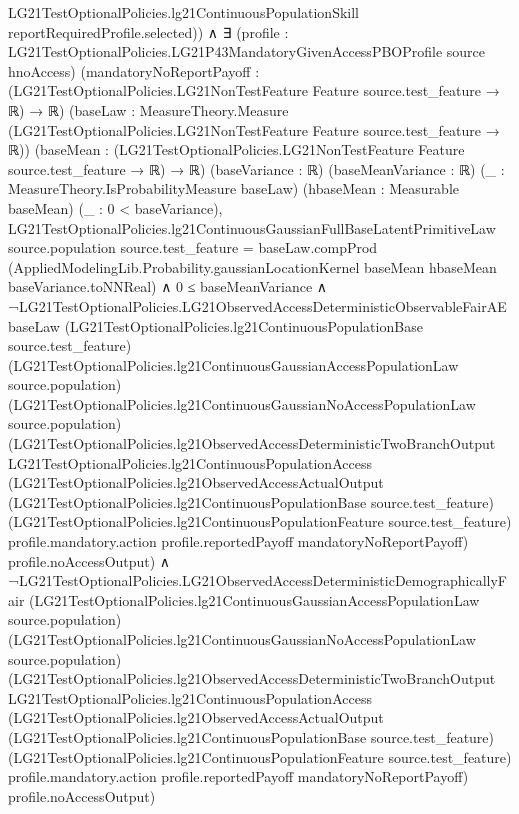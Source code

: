 \documentclass[10pt]{article}
\begin{document}
\begin{ReviewVerbatim}
          LG21TestOptionalPolicies.lg21ContinuousPopulationSkill reportRequiredProfile.selected)) ∧
    ∃ (profile : LG21TestOptionalPolicies.LG21P43MandatoryGivenAccessPBOProfile source hnoAccess)
      (mandatoryNoReportPayoff : (LG21TestOptionalPolicies.LG21NonTestFeature Feature source.test_feature → ℝ) → ℝ)
      (baseLaw : MeasureTheory.Measure (LG21TestOptionalPolicies.LG21NonTestFeature Feature source.test_feature → ℝ))
      (baseMean : (LG21TestOptionalPolicies.LG21NonTestFeature Feature source.test_feature → ℝ) → ℝ) (baseVariance : ℝ)
      (baseMeanVariance : ℝ) (_ : MeasureTheory.IsProbabilityMeasure baseLaw) (hbaseMean : Measurable baseMean) (_ :
      0 < baseVariance),
      LG21TestOptionalPolicies.lg21ContinuousGaussianFullBaseLatentPrimitiveLaw source.population source.test_feature =
          baseLaw.compProd
            (AppliedModelingLib.Probability.gaussianLocationKernel baseMean hbaseMean baseVariance.toNNReal) ∧
        0 ≤ baseMeanVariance ∧
          ¬LG21TestOptionalPolicies.LG21ObservedAccessDeterministicObservableFairAE baseLaw
                (LG21TestOptionalPolicies.lg21ContinuousPopulationBase source.test_feature)
                (LG21TestOptionalPolicies.lg21ContinuousGaussianAccessPopulationLaw source.population)
                (LG21TestOptionalPolicies.lg21ContinuousGaussianNoAccessPopulationLaw source.population)
                (LG21TestOptionalPolicies.lg21ObservedAccessDeterministicTwoBranchOutput
                  LG21TestOptionalPolicies.lg21ContinuousPopulationAccess
                  (LG21TestOptionalPolicies.lg21ObservedAccessActualOutput
                    (LG21TestOptionalPolicies.lg21ContinuousPopulationBase source.test_feature)
                    (LG21TestOptionalPolicies.lg21ContinuousPopulationFeature source.test_feature)
                    profile.mandatory.action profile.reportedPayoff mandatoryNoReportPayoff)
                  profile.noAccessOutput) ∧
            ¬LG21TestOptionalPolicies.LG21ObservedAccessDeterministicDemographicallyFair
                (LG21TestOptionalPolicies.lg21ContinuousGaussianAccessPopulationLaw source.population)
                (LG21TestOptionalPolicies.lg21ContinuousGaussianNoAccessPopulationLaw source.population)
                (LG21TestOptionalPolicies.lg21ObservedAccessDeterministicTwoBranchOutput
                  LG21TestOptionalPolicies.lg21ContinuousPopulationAccess
                  (LG21TestOptionalPolicies.lg21ObservedAccessActualOutput
                    (LG21TestOptionalPolicies.lg21ContinuousPopulationBase source.test_feature)
                    (LG21TestOptionalPolicies.lg21ContinuousPopulationFeature source.test_feature)
                    profile.mandatory.action profile.reportedPayoff mandatoryNoReportPayoff)
                  profile.noAccessOutput)
\end{ReviewVerbatim}
\end{document}
